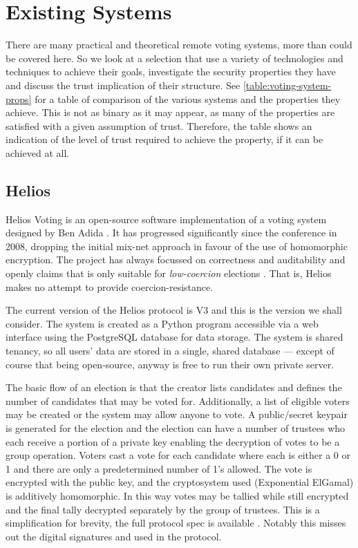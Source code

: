 \section{Existing Systems}
\label{ch:ev:existing}

There are many practical and theoretical remote voting systems, more than could be covered here. So we look at a selection that use a variety of technologies and techniques to achieve their goals, investigate the security properties they have and discuss the trust implication of their structure. See \autoref{table:voting-system-props} for a table of comparison of the various systems and the properties they achieve. This is not as binary as it may appear, as many of the properties are satisfied with a given assumption of trust. Therefore, the table shows an indication of the level of trust required to achieve the property, if it can be achieved at all.

\subsection{Helios}

Helios Voting is an open-source software implementation of a voting system designed by Ben Adida \cite{adidaHeliosWebBasedOpenAudit2008}. It has progressed significantly since the conference in 2008, dropping the initial mix-net approach in favour of the use of homomorphic encryption. The project has always focussed on correctness and auditability and openly claims that is only suitable for \emph{low-coercion} elections \cite{HeliosVotingFAQ}. That is, Helios makes no attempt to provide coercion-resistance.

The current version of the Helios protocol is V3 and this is the version we shall consider. The system is created as a Python program accessible via a web interface using the PostgreSQL database for data storage. The system is shared tenancy, so all users' data are stored in a single, shared database --- except of course that being open-source, anyway is free to run their own private server.

The basic flow of an election is that the creator lists candidates and defines the number of candidates that may be voted for. Additionally, a list of eligible voters may be created or the system may allow anyone to vote. A public/secret keypair is generated for the election and the election can have a number of trustees who each receive a portion of a private key enabling the decryption of votes to be a group operation. Voters cast a vote for each candidate where each is either a 0 or 1 and there are only a predetermined number of 1's allowed. The vote is encrypted with the public key, and the cryptosystem used (Exponential ElGamal) is additively homomorphic. In this way votes may be tallied while still encrypted and the final tally decrypted separately by the group of trustees. This is a simplification for brevity, the full protocol spec is available \cite{HeliosHeliosV3}. Notably this misses out the digital signatures and  used in the protocol.


